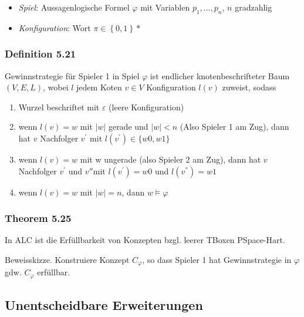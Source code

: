 \begin{itemize}
\item
  \emph{Spiel}: Aussagenlogische Formel $\varphi$ mit Variablen
  $p_{1},\ldots,p_{n}$, $n$ gradzahlig
\item
  \emph{Konfiguration}: Wort $\pi \in \left\{ 0,1 \right\}*$
\end{itemize}

\subsubsection{Definition 5.21}\label{definition-5.21}

Gewinnstrategie für Spieler 1 in Spiel $\varphi$ ist endlicher
knotenbeschrifteter Baum $(V,E,L)$, wobei $l$ jedem Koten
$v \in V$ Konfiguration $l(v)$ zuweist, sodass

\begin{enumerate}
\def\labelenumi{\alph{enumi})}
\item
  Wurzel beschriftet mit $\varepsilon$ (leere Konfiguration)
\item
  wenn $l\left( v \right) = w$ mit $\left| w \right|$ gerade und
  $\left| w \right| < n$ (Also Spieler 1 am Zug), dann hat $v$
  Nachfolger $v^{'}$ mit $l\left( v^{'} \right) \in \{ w0,w1\}$
\item
  wenn $l\left( v \right) = w$ mit \textbar{}w\textbar{} ungerade
  (also Spieler 2 am Zug), dann hat $v$ Nachfolger $v^{'}$ und
  $v''$mit $l\left( v^{'} \right) = w0$ und
  $l\left( v^{''} \right) = w1$
\item
  wenn $l\left( v \right) = w$ mit $\left| w \right| = n$, dann
  $w \vDash \varphi$
\end{enumerate}

\subsubsection{Theorem 5.25}\label{theorem-5.25}

In ALC ist die Erfüllbarkeit von Konzepten bzgl. leerer TBoxen
PSpace-Hart.

Beweisskizze. Konstruiere Konzept $C_{\varphi}$, so dass Spieler 1 hat
Gewinnstrategie in $\varphi$ gdw. $C_{\varphi}$ erfüllbar.

\subsection{Unentscheidbare
Erweiterungen}\label{unentscheidbare-erweiterungen}

